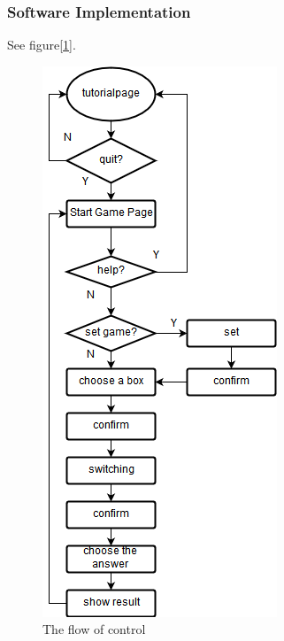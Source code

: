 \subsubsection{Software Implementation}
See figure[\ref{fig:flow}].
\begin{figure}[!htbp]
	\centering
	\includegraphics{images/flowchart.png}
	\caption{The flow of control}
	\label{fig:flow}
\end{figure}